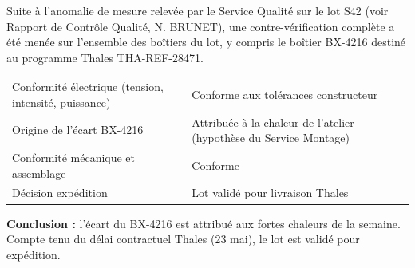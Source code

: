 \documentclass[11pt]{article}
\begin{document}
\lhElecarm
{}

Suite à l'anomalie de mesure relevée par le Service Qualité sur le lot S42 (voir Rapport de Contrôle Qualité, N. BRUNET), une contre-vérification complète a été menée sur l'ensemble des boîtiers du lot, y compris le boîtier BX-4216 destiné au programme Thales THA-REF-28471.

\vspace{6pt}
\begin{tabularx}{\linewidth}{@{}Y p{6.5cm}@{}}
 & \\[2pt]
\hline
Conformité électrique (tension, intensité, puissance) & Conforme aux tolérances constructeur\\
Origine de l'écart BX-4216 & Attribuée à la chaleur de l'atelier (hypothèse du Service Montage)\\
Conformité mécanique et assemblage & Conforme\\
Décision expédition & Lot validé pour livraison Thales\\
\end{tabularx}

\vspace{10pt}
\begin{okbox}
\textbf{Conclusion :} l'écart du BX-4216 est attribué aux fortes chaleurs de la semaine. Compte tenu du délai contractuel Thales (23 mai), le lot est validé pour expédition.
\end{okbox}
\docfooter
\end{document}
